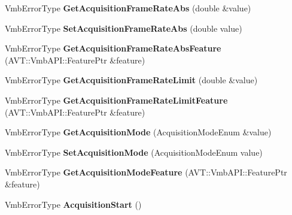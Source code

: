 \begin{DoxyCompactItemize}
\item 
\hypertarget{classMakoCamera_a09bc3bb0403ae61c9b4396db9bd5dda3}{Vmb\-Error\-Type {\bfseries Get\-Acquisition\-Frame\-Rate\-Abs} (double \&value)}\label{classMakoCamera_a09bc3bb0403ae61c9b4396db9bd5dda3}

\item 
\hypertarget{classMakoCamera_a6a51a1a9781c6aba75a1324056e247ae}{Vmb\-Error\-Type {\bfseries Set\-Acquisition\-Frame\-Rate\-Abs} (double value)}\label{classMakoCamera_a6a51a1a9781c6aba75a1324056e247ae}

\item 
\hypertarget{classMakoCamera_a08001d452e6139fd478f443436e652f9}{Vmb\-Error\-Type {\bfseries Get\-Acquisition\-Frame\-Rate\-Abs\-Feature} (A\-V\-T\-::\-Vmb\-A\-P\-I\-::\-Feature\-Ptr \&feature)}\label{classMakoCamera_a08001d452e6139fd478f443436e652f9}

\item 
\hypertarget{classMakoCamera_ac2b3b896c304dcd3396dbad3aa06efca}{Vmb\-Error\-Type {\bfseries Get\-Acquisition\-Frame\-Rate\-Limit} (double \&value)}\label{classMakoCamera_ac2b3b896c304dcd3396dbad3aa06efca}

\item 
\hypertarget{classMakoCamera_ae22ae6f5cc89772d62c653502a7294b7}{Vmb\-Error\-Type {\bfseries Get\-Acquisition\-Frame\-Rate\-Limit\-Feature} (A\-V\-T\-::\-Vmb\-A\-P\-I\-::\-Feature\-Ptr \&feature)}\label{classMakoCamera_ae22ae6f5cc89772d62c653502a7294b7}

\item 
\hypertarget{classMakoCamera_a814938f2dfb3ae225ef8bb5f109ac743}{Vmb\-Error\-Type {\bfseries Get\-Acquisition\-Mode} (Acquisition\-Mode\-Enum \&value)}\label{classMakoCamera_a814938f2dfb3ae225ef8bb5f109ac743}

\item 
\hypertarget{classMakoCamera_a5dc896cf31da219bd120e9ac8897d56d}{Vmb\-Error\-Type {\bfseries Set\-Acquisition\-Mode} (Acquisition\-Mode\-Enum value)}\label{classMakoCamera_a5dc896cf31da219bd120e9ac8897d56d}

\item 
\hypertarget{classMakoCamera_a11baccf010babeea39dbc6c1a89cdd4e}{Vmb\-Error\-Type {\bfseries Get\-Acquisition\-Mode\-Feature} (A\-V\-T\-::\-Vmb\-A\-P\-I\-::\-Feature\-Ptr \&feature)}\label{classMakoCamera_a11baccf010babeea39dbc6c1a89cdd4e}

\item 
\hypertarget{classMakoCamera_a627755175c2611c7349307d9cb333867}{Vmb\-Error\-Type {\bfseries Acquisition\-Start} ()}\label{classMakoCamera_a627755175c2611c7349307d9cb333867}


\end{DoxyCompactItemize}
